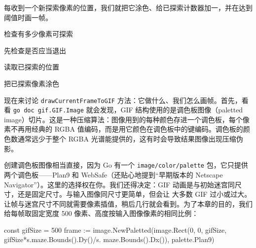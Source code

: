 每收到一个新探索像素的位置，我们就把它涂色、给已探索计数器加一，并在达到阈值时画一帧。


\begin{codeannotations}
\item 检查有多少像素可探索
\item 先检查是否应当退出
\item 读取已探索的位置
\item 把已探索像素涂色
\end{codeannotations}

现在来讨论 \texttt{drawCurrentFrameToGIF} 方法：它做什么、我们怎么画帧。首先，看看 \texttt{go doc gif.GIF.Image} 就会发现，GIF 结构使用的是调色板图像（paletted image）切片。这是一种压缩算法：图像用到的每种颜色存进一个调色板，每个像素不再用经典的 RGBA 值编码，而是用它颜色在调色板中的键编码。调色板的颜色数通常远少于整个 RGBA 光谱能提供的，这有时会导致结果图像出现压缩伪影。

创建调色板图像相当直接，因为 Go 有一个 \texttt{image/color/palette} 包，它只提供两个调色板——Plan9 和 WebSafe（还贴心地提到``早期版本的 Netscape Navigator''）。这里的选择权在你。我们还得决定：GIF 动画是与初始迷宫同尺寸，还是固定尺寸。与输入图像同尺寸更简单，但会让
大多数 GIF 过小或过大。让帧与迷宫尺寸不同就需要像素插值，稍后几行就会看到。为了本章的目的，我们给每帧取固定宽度 500 像素、高度按输入图像像素的相同比例：

\begin{gocode}[]
const gifSize = 500
frame := image.NewPaletted(image.Rect(0, 0, gifSize, gifSize*s.maze.Bounds().Dy()/s.
maze.Bounds().Dx()), palette.Plan9)
\end{gocode}


